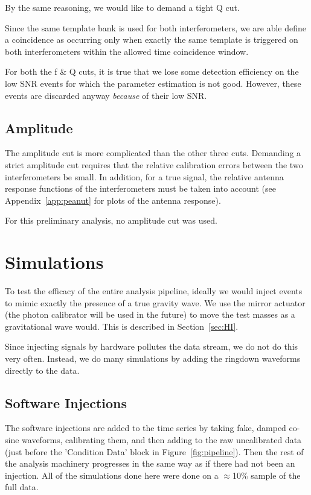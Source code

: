 By the same reasoning, we would like to demand a tight Q cut. 

Since the same template bank is used
for both interferometers, we are able define a coincidence as occurring only
when exactly the same template is triggered on both interferometers within the
allowed time coincidence window.

For both the f \& Q cuts, it is true that we lose some detection efficiency on
the low SNR events for which the parameter estimation is not good. However, these
events are discarded anyway \emph{because} of their low SNR.

\subsection{Amplitude}

The amplitude cut is more complicated than the other three cuts. Demanding
a strict amplitude cut requires that the relative calibration errors
between the two interferometers be small. In addition, for a true signal,
the relative antenna response functions of the interferometers must be 
taken into account (see Appendix~\ref{app:peanut} for plots of the
antenna response).

For this preliminary analysis, no amplitude cut was used.


\section{Simulations}

To test the efficacy of the entire analysis pipeline, ideally we would inject
events to mimic exactly the presence of a true gravity wave. We use the mirror
actuator (the photon calibrator will be used in the future) to move the 
test masses as a gravitational wave would. This is described in Section~\ref{sec:HI}.

Since injecting signals by hardware pollutes the data stream, we do not do
this very often. Instead, we do many simulations by adding the ringdown
waveforms directly to the data.


\subsection{Software Injections}
\label{sec:SI}

The software injections are added to the time series by taking fake,
damped co-sine waveforms, calibrating them, and then adding to the raw
uncalibrated data (just before the 'Condition Data' block in
Figure~\ref{fig:pipeline}). Then the rest of the analysis machinery
progresses in the same way as if there had not been an injection. All of the
simulations done here were done on a $\approx$10\% sample of the full data. 

